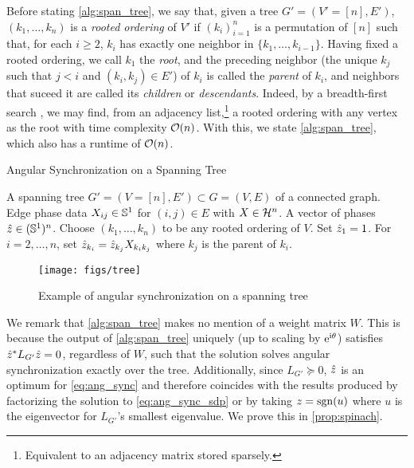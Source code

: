 Before stating \cref{alg:span_tree}, we say that, given a tree $G' = (V' = [n], E')$, $(k_1, \ldots, k_n)$ is a \emph{rooted ordering} of $V'$ if $(k_i)_{i = 1}^n$ is a permutation of $[n]$ such that, for each $i \ge 2$, $k_i$ has exactly one neighbor in $\{k_1, \ldots, k_{i - 1}\}$.  Having fixed a rooted ordering, we call $k_1$ the \emph{root}, and the preceding neighbor (the unique $k_j$ such that $j < i$ and $(k_i, k_j) \in E'$) of $k_i$ is called the \emph{parent} of $k_i$, and neighbors that suceed it are called its \emph{children} or \emph{descendants}.  Indeed, by a breadth-first search \cite{skiena2012algorithmgraph}, we may find, from an adjacency list,\footnote{Equivalent to an adjacency matrix stored sparsely.} a rooted ordering with any vertex as the root with time complexity $\mathcal{O}(n)$.  With this, we state \cref{alg:span_tree}, which also has a runtime of $\mathcal{O}(n)$.

\begin{algorithm}[htbp]
\renewcommand{\algorithmicrequire}{\textbf{Input:}}
\renewcommand{\algorithmicensure}{\textbf{Output:}}
\caption{Angular Synchronization on a Spanning Tree}
\label{alg:span_tree}
\begin{algorithmic}[1]
    \REQUIRE A spanning tree $G' = (V = [n], E') \subset G = (V, E)$ of a connected graph.  Edge phase data $X_{ij} \in \mathbb{S}^1$ for $(i, j) \in E$ with $X \in \mathcal{H}^n$.
    \ENSURE A vector of phases $\hat{z} \in (\mathbb{S}^1)^n$.
    \STATE Choose $(k_1, \ldots, k_n)$ to be any rooted ordering of $V$.
    \STATE Set $\hat{z}_1 = 1$.
    \STATE For $i = 2, \ldots, n$, set $\hat{z}_{k_i} = \hat{z}_{k_j} X_{k_i k_j}$ where $k_j$ is the parent of $k_i$.
    \end{algorithmic}
\end{algorithm}

\begin{figure}
  \centering
  \texttt{[image: figs/tree]}
  \caption{Example of angular synchronization on a spanning tree}
  \label{fig:tree_example}
\end{figure}

We remark that \cref{alg:span_tree} makes no mention of a weight matrix $W$.  This is because the output of \cref{alg:span_tree} uniquely (up to scaling by $\mathrm{e}^{\mathrm{i} \theta}$) satisfies $\hat{z}^* L_{G'} \hat{z} = 0$, regardless of $W$, such that the solution solves angular synchronization exactly over the tree.  Additionally, since $L_{G'} \succeq 0$, $\hat{z}$ is an optimum for \eqref{eq:ang_sync} and therefore coincides with the results produced by factorizing the solution to \eqref{eq:ang_sync_sdp} or by taking $z = \operatorname{sgn}(u)$ where $u$ is the eigenvector for $L_{G'}$'s smallest eigenvalue.  We prove this in \cref{prop:spinach}.

